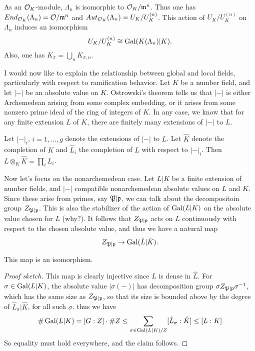 \begin{theorem}
  As an $\mathcal{O}_{K}$-module, $\Lambda_{n}$ is isomorphic to $\mathcal{O}_{K}/\mathfrak{m}^{n}$.
  Thus one has $End_{\mathcal{O}_{K}}(\Lambda_{n}) = \mathcal{O}/\mathfrak{m}^{n}$ and $Aut_{\mathcal{O}_{K}}(\Lambda_{n}) = U_{K}/U_{K}^{(n)}$.
  This action of $U_{K}/U_{K}^{(n)}$ on $\Lambda_{n}$ induces an isomorphism
  \[ U_{K}/U_{K}^{(n)} \cong \operatorname{Gal}(K(\Lambda_{n})|K). \]
  Also, one has $K_{\pi} = \bigcup_{n} K_{\pi,n}$.
\end{theorem}

I would now like to explain the relationship between global and local fields, particularly with respect to ramification behavior.
Let $K$ be a number field, and let $|-|$ be an absolute value on $K$.
Ostrowski's theorem tells us that $|-|$ is either Archemedean arising from some complex embedding, or it arises from some nonzero prime ideal of the ring of integers of $K$.
In any case, we know that for any finite extension $L$ of $K$, there are finitely many extensions of $|-|$ to $L$.

\begin{proposition}
  Let $|-|_{i}$, $i = 1,\ldots,g$ denote the extensions of $|-|$ to $L$.
  Let $\hat K$ denote the completion of $K$ and $\hat L_{i}$ the completion of $L$ with respect to $|-|_{i}$.
  Then $L \otimes_{K} \hat K = \prod_{i} L_{i}$.
\end{proposition}

Now let's focus on the nonarchemedean case.
Let $L|K$ be a finite extension of number fields, and $|-|$ compatible nonarchemedean absolute values on $L$ and $K$.
Since these arise from primes, say $\mathfrak{P}|\mathfrak{p}$, we can talk about the decompositoin group $Z_{\mathfrak{P}|\mathfrak{p}}$.
This is also the stabilizer of the action of $\operatorname{Gal}(L|K)$ on the absolute value chosen for $L$ (why?).
It follows that $Z_{\mathfrak{P}|\mathfrak{p}}$ acts on $L$ continuously with respect to the chosen absolute value, and thus we have a natural map
\[ Z_{\mathfrak{P}|\mathfrak{p}} \to \operatorname{Gal}(\hat L|\hat K). \]
\begin{proposition}
  This map is an isomorphism.
\end{proposition}
\begin{proof}[Proof sketch]
  This map is clearly injective since $L$ is dense in $\hat L$.
  For $\sigma \in \operatorname{Gal}(L|K)$, the absolute value $|\sigma(-)|$ has decomposition group $\sigma Z_{\mathfrak{P}|\mathfrak{p}} \sigma^{-1}$, which has the same size as $Z_{\mathfrak{P}|\mathfrak{p}}$, so that its size is bounded above by the degree of $\hat L_{\sigma}|\hat K$, for all such $\sigma$.
  thus we have
  \[ \# \operatorname{Gal}(L|K) = [G:Z] \cdot \# Z \leq \sum_{\sigma \in \operatorname{Gal}(L|K)/Z} [\hat L_{\sigma}:\hat K] \leq [L:K] \]
  So equality must hold everywhere, and the claim follows.
\end{proof}

